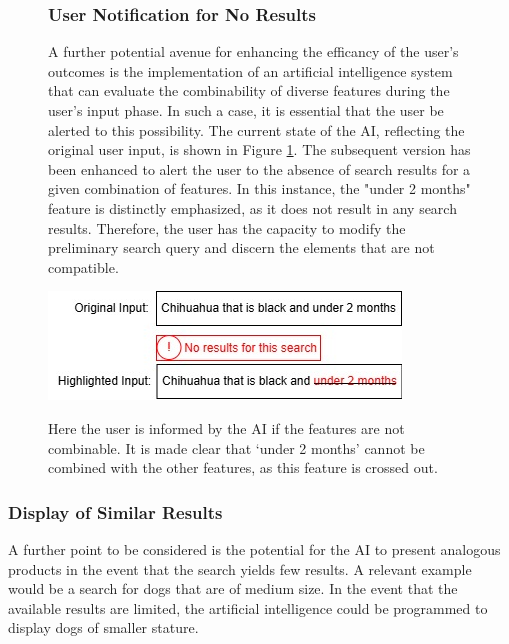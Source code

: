 \documentclass[../../submission.tex]{subfiles}
\begin{document}
\begin{figure}[h]
\centering
\begin{minipage}{0.35\textwidth}
    \subsubsection{User Notification for No Results}
    A further potential avenue for enhancing the efficancy of the user's 
    outcomes is the implementation of an artificial intelligence system that can 
    evaluate the combinability of diverse features during the user's input phase. 
    In such a case, it is essential that the user be alerted to this possibility. 
    The current state of the AI, reflecting the original user input, is shown in Figure \ref{fig:no_result}. The subsequent version has been enhanced to alert the user to the 
    absence of search results for a given combination of features. In this instance, the 
    "under 2 months" feature is distinctly emphasized, as it does not result in any search results. 
    Therefore, the user has the capacity to modify the preliminary search query and discern the 
    elements that are not compatible.  
\end{minipage}
\hfill
\begin{minipage}{0.55\textwidth}
    
    \includegraphics[width=\textwidth]{images/keine_ergebnisse}
    \caption{Here the user is informed by the AI if the features are not combinable. It is made clear that ‘under 2 months’ cannot be combined with the other features, as this feature is crossed out.}
    \Description{}
    \label{fig:no_result}
\end{minipage}
\end{figure}

\subsubsection{Display of Similar Results}   

A further point to be considered is the potential for the AI to present analogous
products in the event that the search yields few results. A relevant example  
would be a search for dogs that are of medium size. In the event that the available 
results are limited, the artificial intelligence could be programmed to display dogs of 
smaller stature.
\end{document}
